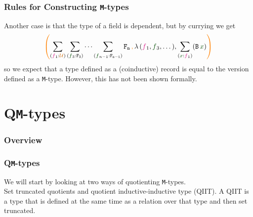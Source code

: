 \documentclass[xelatex,mathserif,serif,notheorems]{beamer} %
\theoremstyle{plain} %
\theoremstyle{definition}
\theoremstyle{remark}
\newcommand*{\term}[1]{\textcolor{green!30!black}{#1}} %
\newcommand*{\type}[1]{\textcolor{magenta!90!black}{#1}}
\newcommand*{\containerpair}[2]{\ensuremath{\colorlet{savedleftcolor}{.}\color{orange}\left(\color{savedleftcolor}#1\,\textcolor{orange}{\mathbf{,}}\,#2\color{orange}\right)\color{savedleftcolor}}}
\newcommand*{\universe}[1]{\textcolor{orange!80!black}{#1}}
\newcommand*{\typeformer}[1]{\ensuremath{\mathtt{#1}}}
\begin{document}
\begin{frame}
  \frametitle{Rules for Constructing \texttt{M}-types}
  Another case is that the type of a field is dependent, but by currying we get
  \begin{equation}
    \containerpair{\sum_{(\type{f}_1 : \universe{\mathcal{U}})} \sum_{(\term{f}_3 : \typeformer{F_3})} \cdots \sum_{(\term{f}_{n-1} : \typeformer{F_{n-1}})}\typeformer{F_n}}{\lambda\,(\type{f}_1,\term{f}_3,\dots),\sum_{(\term{x} : \type{f}_1)} (\typeformer{B}\,\term{x})}
  \end{equation}
  so we expect that a type defined as a (coinductive) record is equal to the version defined as a \texttt{M}-type. However, this has not been shown formally.
\end{frame}

\section{Q\texttt{M}-types}

\begin{frame}
  \frametitle{Overview}
  \tableofcontents[currentsection,subsubsectionstyle=hide]
\end{frame}

\begin{frame}
  \frametitle{Q\texttt{M}-types}
  We will start by looking at two ways of quotienting \texttt{M}-types. \\
  Set truncated quotients and  quotient inductive-inductive type (QIIT). A QIIT is a type that is defined at the same time as a relation over that type and then set truncated.
\end{frame}
\end{document}
